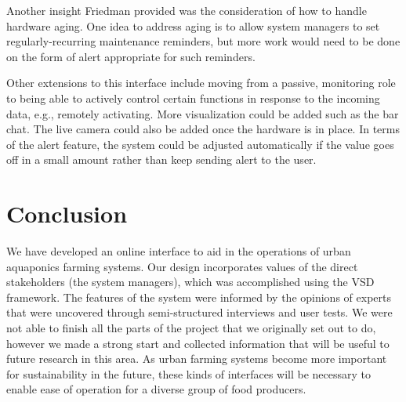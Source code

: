 \documentclass{sigchi}
\begin{document}
Another insight Friedman provided was the consideration of how to handle hardware aging. One idea to address aging is to allow system managers to set regularly-recurring maintenance reminders, but more work would need to be done on the form of alert appropriate for such reminders.  

Other extensions to this interface include moving from a passive, monitoring role to being able to actively control certain functions in response to the incoming data, e.g., remotely activating. More visualization could be added such as the bar chat. The live camera could also be added once the hardware is in place. In terms of the alert feature, the system could be adjusted automatically if the value goes off in a small amount rather than keep sending alert to the user.

\section{Conclusion}

We have developed an online interface to aid in the operations of urban aquaponics farming systems. Our design incorporates values of the direct stakeholders (the system managers), which was accomplished using the VSD framework. The features of the system were informed by the opinions of experts that were uncovered through semi-structured interviews and user tests. We were not able to finish all the parts of the project that we originally set out to do, however we made a strong start and collected information that will be useful to future research in this area. As urban farming systems become more important for sustainability in the future, these kinds of interfaces will be necessary to enable ease of operation for a diverse group of food producers.

%
%
%
%
%
\balance



\end{document}
